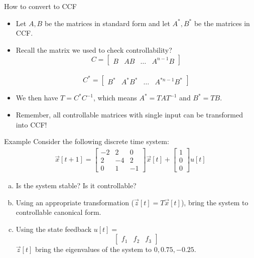 \documentclass{beamer}
\begin{document}
	\begin{frame}{How to convert to CCF}
	\begin{itemize}
	    \item Let $A,B$ be the matrices in standard form and let $A^*,B^*$ be the matrices in CCF. \pause
	    \item Recall the matrix we used to check controllability?\\ \pause 
	    \[C = \begin{bmatrix}
	               B & AB & \hdots & A^{n-1}B
	            \end{bmatrix}\] \\  
	    \[ C^* = \begin{bmatrix}
	               B^*& A^*B^* & \hdots & A^{*n-1}B^*
	            \end{bmatrix}\]
	    \item We then have $T = C^*C^{-1}$,  which means  $A^* = TAT^{-1}$ and $B^* = TB$.
	    \item Remember, all controllable matrices with single input can be transformed into CCF!
	\end{itemize}
	\end{frame}

	\begin{frame}{Example}
	Consider the following discrete time system:
	\begin{align*}
	    \vec{x}[t+1] = \begin{bmatrix} 
	            -2&2&0\\
	            2&-4&2\\ 
	            0&1&-1
	            \end{bmatrix}\vec{x}[t] + \begin{bmatrix} 1 \\ 0 \\0 \end{bmatrix}u[t] 
	\end{align*}

	\begin{enumerate}[(a)]
	    \item Is the system stable? Is it controllable? 
	    \item Using an appropriate transformation ($\vec{z}[t] = T\vec{x}[t]$), bring the system to controllable canonical form. 
	    \item Using the state feedback $u[t] =$ \[\begin{bmatrix} f_1 & f_2 & f_3  \end{bmatrix}\] $\vec{z}[t]$ bring the eigenvalues of the system to $0,0.75, -0.25$.
	\end{enumerate}
	\end{frame}
\end{document}
